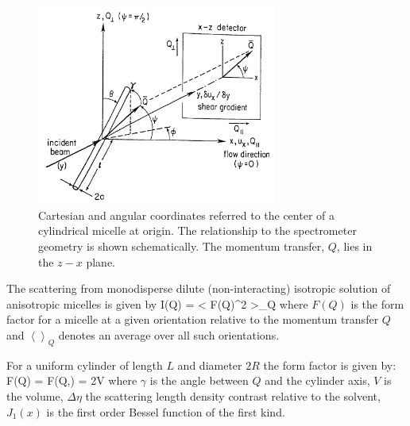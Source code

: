 \begin{figure}[htb]
\begin{center}
\includegraphics[width=0.7\textwidth,height=0.7\textwidth]{shear_cuette_SANS_geometry.png}
\end{center}
\caption{Cartesian and angular coordinates referred to the center
of a cylindrical micelle at origin. The relationship to the
spectrometer geometry is shown schematically. The momentum
transfer, $Q$, lies in the $z-x$ plane.}
\label{shear_cuette_SANS_geometry}
\end{figure}

The scattering from monodisperse dilute (non-interacting)
isotropic solution of anisotropic micelles is given by \BE I(Q) =
\left< \vert F(Q)\vert^2 \right>_Q \label{IQ_av} \EE where $F(Q)$
is the form factor for a micelle at a given orientation relative
to the momentum transfer $Q$ and $\left<\right>_Q$ denotes an
average over all such orientations.

For a uniform cylinder of length $L$ and diameter $2R$ the form
factor is given by:
\BE F(Q) = F(Q,\gamma) = 2\Delta\eta V
\EE
where $\gamma$ is the
angle between $Q$ and the cylinder axis, $V$ is the volume,
$\Delta\eta$ the scattering length density contrast relative to
the solvent, $J_1(x)$ is the first order Bessel function of the
first kind.


